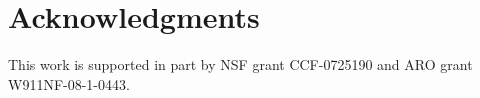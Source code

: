 \documentclass[times, 10pt,twocolumn]{article}
\begin{document}
\vspace*{-2ex}
\vspace*{-2ex}
\vspace*{-2ex}
%
\vspace*{-2ex}
\vspace*{-2ex}
\vspace*{-2ex}

\newline

\section*{Acknowledgments} 
This work is supported in part by NSF grant
CCF-0725190 and ARO grant W911NF-08-1-0443.



\end{document}
